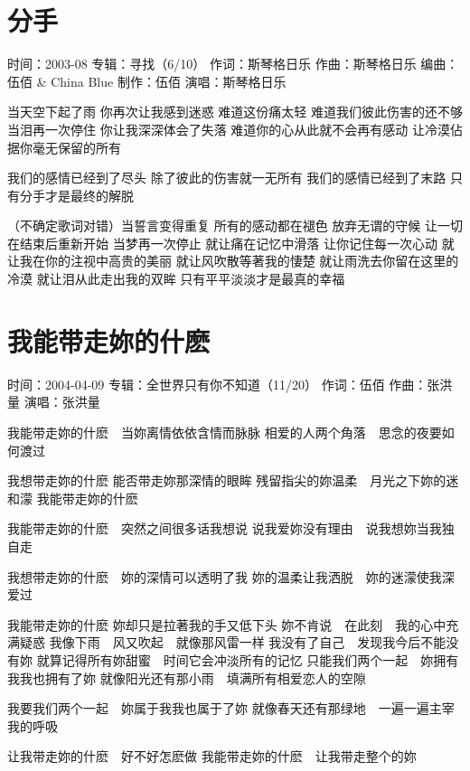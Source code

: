 \documentclass[UTF8,a4paper,oneside,twocolumn,12pt]{ctexbook}
\newcommand{\infopair}[2]{\textbullet #1：#2}
\newcommand{\zc}[1][伍佰]{\infopair{作词}{#1}}
\newcommand{\zq}[1][伍佰]{\infopair{作曲}{#1}}
\newcommand{\bq}[1][伍佰]{\infopair{编曲}{#1}}
\newcommand{\zj}[1]{\infopair{专辑}{#1}}
\newcommand{\zz}[1]{\infopair{制作}{#1}}
\newcommand{\sj}[1]{\infopair{时间}{#1}}
\newenvironment{info}{\begin{flushleft}\kaishu
	}
	{\end{flushleft}\normalsize\yahei\par}
\newenvironment{lyric}{
	}
{}
\begin{document}
\section{分手}
\begin{info}
	\sj{2003-08}
	\zj{寻找（6/10）}
	\zc[斯琴格日乐]
	\zq[斯琴格日乐]
	\bq[伍佰 \& China Blue]
	\zz{伍佰}
	\infopair{演唱}{斯琴格日乐}
\end{info}
\begin{lyric}
	当天空下起了雨
	你再次让我感到迷惑
	难道这份痛太轻
	难道我们彼此伤害的还不够
	当泪再一次停住
	你让我深深体会了失落
	难道你的心从此就不会再有感动
	让冷漠佔据你毫无保留的所有

	我们的感情已经到了尽头
	除了彼此的伤害就一无所有
	我们的感情已经到了末路
	只有分手才是最终的解脱

	（不确定歌词对错）当誓言变得重复
	所有的感动都在褪色
	放弃无谓的守候
	让一切在结束后重新开始
	当梦再一次停止
	就让痛在记忆中滑落
	让你记住每一次心动
	就让我在你的注视中高贵的美丽
	就让风吹散等著我的悽楚
	就让雨洗去你留在这里的冷漠
	就让泪从此走出我的双眸
	只有平平淡淡才是最真的幸福
\end{lyric}

\section{我能带走妳的什麽}
\begin{info}
	\sj{2004-04-09}
	\zj{全世界只有你不知道（11/20）}
	\zc[伍佰]
	\zq[张洪量]
	\infopair{演唱}{张洪量}
\end{info}
\begin{lyric}
	我能带走妳的什麽　当妳离情依依含情而脉脉
	相爱的人两个角落　思念的夜要如何渡过

	我想带走妳的什麽
	能否带走妳那深情的眼眸
	残留指尖的妳温柔　月光之下妳的迷和濛
	我能带走妳的什麽

	我能带走妳的什麽　突然之间很多话我想说
	说我爱妳没有理由　说我想妳当我独自走

	我想带走妳的什麽　妳的深情可以透明了我
	妳的温柔让我洒脱　妳的迷濛使我深爱过

	我能带走妳的什麽
	妳却只是拉著我的手又低下头
	妳不肯说　在此刻　我的心中充满疑惑
	我像下雨　风又吹起　就像那风雷一样
	我没有了自己　发现我今后不能没有妳
	就算记得所有妳甜蜜　时间它会冲淡所有的记忆
	只能我们两个一起　妳拥有我我也拥有了妳
	就像阳光还有那小雨　填满所有相爱恋人的空隙

	我要我们两个一起　妳属于我我也属于了妳
	就像春天还有那绿地　一遍一遍主宰我的呼吸

	让我带走妳的什麽　好不好怎麽做
	我能带走妳的什麽　让我带走整个的妳
\end{lyric}
\end{document}
